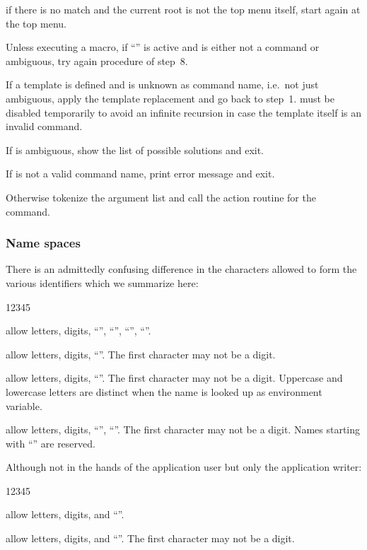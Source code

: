 \begin{OL}
\begin{UL}
if there is no match and the current root is not the top menu itself,
start again at the top menu.
\end{UL}
\item%
Unless executing a macro, if ``'' 
is active and  is either not a command or ambiguous,
try again procedure of step~8.
\item%
If a  template is defined and  is unknown
as command name, i.e.\ not just ambiguous, apply the template
replacement and go back to step~1.
 must be disabled temporarily to avoid an infinite
recursion in case the template itself is an invalid command.
\item%
If  is ambiguous, show the list of possible solutions and
exit.
\item%
If  is not a valid command name, print error message and
exit.
\item%
Otherwise tokenize the argument list and call the action routine for
the command.
\end{OL}


\subsubsection{Name spaces}

There is an admittedly confusing difference in the characters allowed
to form the various \KUIP{} identifiers which we summarize here:
\begin{DL}{12345}
\item[\textem{Alias names }]
allow letters, digits, ``\Lit{_}'', ``'', ``\Lit{-}'', ``\Lit{$}''.
\item[\textem{Macro variable names }]
allow letters, digits, ``\Lit{_}''.
The first character may not be a digit.
\item[\textem{System function names }]
allow letters, digits, ``\Lit{_}''.
The first character may not be a digit.
Uppercase and lowercase letters are distinct when the name is looked up
as environment variable.
\ifVECTOR
\item[\textem{Vector names }]
allow letters, digits, ``\Lit{_}'', ``''.
The first character may not be a digit.
Names starting with ``'' are reserved.
\fi
\end{DL}

Although not in the hands of the application user but only the
application writer:
\begin{DL}{12345}
\item[\textem{Command and menu names }]
allow letters, digits, and ``\Lit{_}''.
\item[\textem{Parameter names }]
allow letters, digits, and ``\Lit{_}''.
The first character may not be a digit.
\end{DL}



